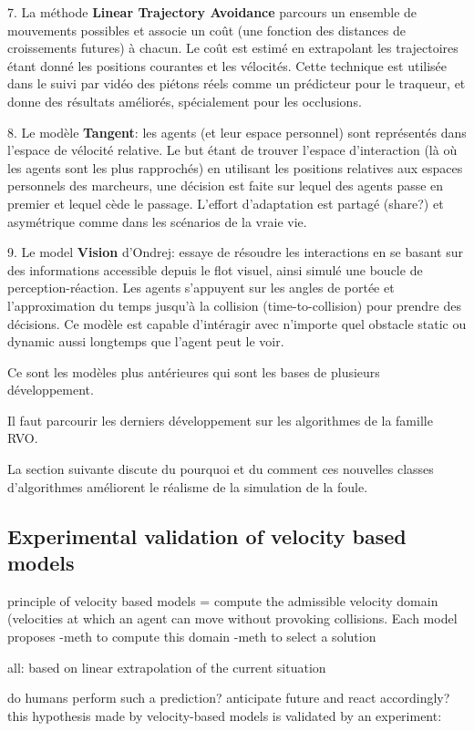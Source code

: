 \documentclass[11pt]{report}
\begin{document}
7. La méthode \textbf{Linear Trajectory Avoidance} parcours un ensemble de mouvements possibles et associe un coût (une fonction des distances de croissements futures) à chacun. Le coût est estimé en extrapolant les trajectoires étant donné les positions courantes et les vélocités. Cette technique est utilisée dans le suivi par vidéo des piétons réels comme un prédicteur pour le traqueur, et donne des résultats améliorés, spécialement pour les occlusions.

8. Le modèle \textbf{Tangent}: les agents (et leur espace personnel) sont représentés dans l'espace de vélocité relative. Le but étant de trouver l'espace d'interaction (là où les agents sont les plus rapprochés) en utilisant les positions relatives aux espaces personnels des marcheurs, une décision est faite sur lequel des agents passe en premier et lequel cède le passage. L'effort d'adaptation est partagé (share?) et asymétrique comme dans les scénarios de la vraie vie.

9. Le model \textbf{Vision} d'Ondrej: essaye de résoudre les interactions en se basant sur des informations accessible depuis le flot visuel, ainsi simulé une boucle de perception-réaction. Les agents s'appuyent sur les angles de portée et l'approximation du temps jusqu'à la collision (time-to-collision) pour prendre des décisions. Ce modèle est capable d'intéragir avec n'importe quel obstacle static ou dynamic aussi longtemps que l'agent peut le voir.

Ce sont les modèles plus antérieures qui sont les bases de plusieurs développement.

Il faut parcourir les derniers développement sur les algorithmes de la famille RVO.

La section suivante discute du pourquoi et du comment ces nouvelles classes d'algorithmes améliorent le réalisme de la simulation de la foule.

\subsection{Experimental validation of velocity based models}

principle of velocity based models = compute the admissible velocity domain (velocities at which an agent can move without provoking collisions. Each model proposes
-meth to compute this domain
-meth to select a solution

all: based on linear extrapolation of the current situation

do humans perform such a prediction? anticipate future and react accordingly? 
this hypothesis made by velocity-based models is validated by an experiment:
\end{document}
